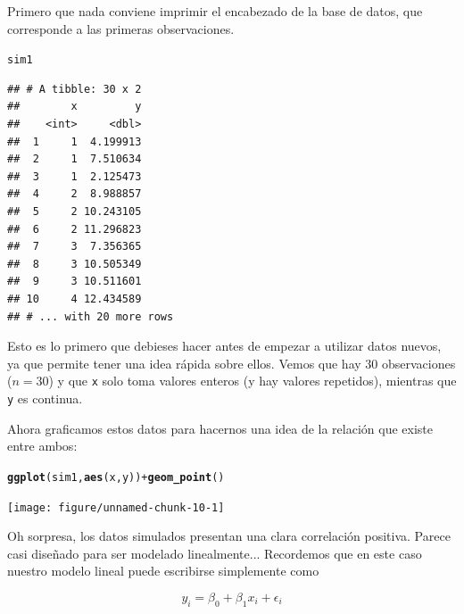 \documentclass{article}\usepackage[]{graphicx}\usepackage[]{color}
\makeatletter
\newcommand{\hlopt}[1]{\textcolor[rgb]{0,0,0}{#1}}%
\newcommand{\hlstd}[1]{\textcolor[rgb]{0.345,0.345,0.345}{#1}}%
\newcommand{\hlkwd}[1]{\textcolor[rgb]{0.737,0.353,0.396}{\textbf{#1}}}%
\newenvironment{kframe}{%
 \def\at@end@of@kframe{}%
 \ifinner\ifhmode%
  \def\at@end@of@kframe{\end{minipage}}%
  \begin{minipage}{\columnwidth}%
 \fi\fi%
 \def\FrameCommand##1{\hskip\@totalleftmargin \hskip-\fboxsep
 \colorbox{shadecolor}{##1}\hskip-\fboxsep
     \hskip-\linewidth \hskip-\@totalleftmargin \hskip\columnwidth}%
 \MakeFramed {\advance\hsize-\width
   \@totalleftmargin\z@ \linewidth\hsize
   \@setminipage}}%
 {\par\unskip\endMakeFramed%
 \at@end@of@kframe}
\newenvironment{knitrout}{}{} %
\makeatother
\begin{document}
Primero que nada conviene imprimir el encabezado de la base de datos, que corresponde a las primeras observaciones.

\begin{knitrout}
\color{fgcolor}\begin{kframe}
\begin{alltt}
\hlstd{sim1}
\end{alltt}
\begin{verbatim}
## # A tibble: 30 x 2
##        x         y
##    <int>     <dbl>
##  1     1  4.199913
##  2     1  7.510634
##  3     1  2.125473
##  4     2  8.988857
##  5     2 10.243105
##  6     2 11.296823
##  7     3  7.356365
##  8     3 10.505349
##  9     3 10.511601
## 10     4 12.434589
## # ... with 20 more rows
\end{verbatim}
\end{kframe}
\end{knitrout}

Esto es lo primero que debieses hacer antes de empezar a utilizar datos nuevos, ya que permite tener una idea rápida sobre ellos. Vemos que hay 30 observaciones ($n=30$) y que \verb|x| solo toma valores enteros (y hay valores repetidos), mientras que \verb|y| es continua.

Ahora graficamos estos datos para hacernos una idea de la relación que existe entre ambos:

\begin{knitrout}
\color{fgcolor}\begin{kframe}
\begin{alltt}
\hlkwd{ggplot}\hlstd{(sim1,} \hlkwd{aes}\hlstd{(x, y))} \hlopt{+} \hlkwd{geom_point}\hlstd{()}
\end{alltt}
\end{kframe}

{\centering \texttt{[image: figure/unnamed-chunk-10-1]} 

}



\end{knitrout}

Oh sorpresa, los datos simulados presentan una clara correlación positiva. Parece casi diseñado para ser modelado linealmente...
Recordemos que en este caso nuestro modelo lineal puede escribirse simplemente como

\begin{equation*}
y_i = \beta_0 + \beta_1 x_i + \epsilon_i 
\end{equation*}
\end{document}
